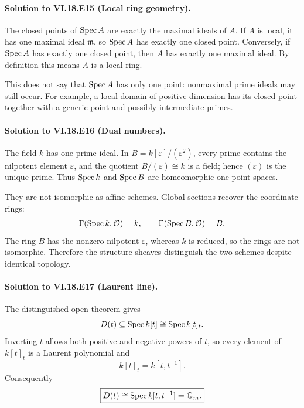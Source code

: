\paragraph{Solution to VI.18.E15 (Local ring geometry).}
\begin{solution}
The closed points of $\operatorname{Spec} A$ are exactly the maximal ideals of $A$. If $A$ is local, it has one maximal ideal $\mathfrak m$, so $\operatorname{Spec} A$ has exactly one closed point. Conversely, if $\operatorname{Spec} A$ has exactly one closed point, then $A$ has exactly one maximal ideal. By definition this means $A$ is a local ring.

This does not say that $\operatorname{Spec} A$ has only one point: nonmaximal prime ideals may still occur. For example, a local domain of positive dimension has its closed point together with a generic point and possibly intermediate primes.
\end{solution}

\paragraph{Solution to VI.18.E16 (Dual numbers).}
\begin{solution}
The field $k$ has one prime ideal. In $B=k[\varepsilon]/(\varepsilon^2)$, every prime contains the nilpotent element $\varepsilon$, and the quotient $B/(\varepsilon)\cong k$ is a field; hence $(\varepsilon)$ is the unique prime. Thus $\operatorname{Spec} k$ and $\operatorname{Spec} B$ are homeomorphic one-point spaces.

They are not isomorphic as affine schemes. Global sections recover the coordinate rings:
\[
\Gamma(\operatorname{Spec} k,\mathcal O)=k,
\qquad
\Gamma(\operatorname{Spec} B,\mathcal O)=B.
\]
The ring $B$ has the nonzero nilpotent $\varepsilon$, whereas $k$ is reduced, so the rings are not isomorphic. Therefore the structure sheaves distinguish the two schemes despite identical topology.
\end{solution}

\paragraph{Solution to VI.18.E17 (Laurent line).}
\begin{solution}
The distinguished-open theorem gives
\[
D(t)\subseteq\operatorname{Spec} k[t]\cong\operatorname{Spec} k[t]_t.
\]
Inverting $t$ allows both positive and negative powers of $t$, so every element of $k[t]_t$ is a Laurent polynomial and
\[
k[t]_t=k[t,t^{-1}].
\]
Consequently
\[
\boxed{D(t)\cong\operatorname{Spec} k[t,t^{-1}]=\mathbb G_m.}
\]
\end{solution}

